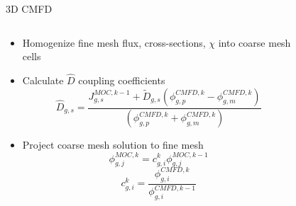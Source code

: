 \begin{frame}[t]{3D CMFD}
    
    \begin{columns}
      \begin{column}{0.6\textwidth}
        \begin{itemize}
          \item Homogenize fine mesh flux, cross-sections, $\chi$ into coarse 
          mesh cells
          \item Calculate $\hat{D}$ coupling coefficients
          \begin{equation*}\scriptstyle
          \hat{D}_{g,s} = \frac{J_{g,s}^{MOC,k-1} + 
            \tilde{D}_{g,s}\left(\phi_{g,p}^{CMFD,k} - 
            \phi_{g,m}^{CMFD,k}\right)}{\left(\phi_{g,p}^{CMFD,k} + 
            \phi_{g,m}^{CMFD,k}\right)}
          \end{equation*}
          \item Project coarse mesh solution to fine mesh
          \begin{equation*}\scriptstyle
          \phi_{g,j}^{MOC,k} = c_{g,i}^k \phi_{g,j}^{MOC,k-1}
          \end{equation*}
          \begin{equation*}\scriptstyle
          c_{g,i}^k = \frac{\phi_{g,i}^{CMFD,k}}{\phi_{g,i}^{CMFD,k-1}}
          \end{equation*}
        \end{itemize}
      \end{column}
    \begin{column}{0.4\textwidth}
      \begin{figure}[h]
        \centering
        \resizebox{!}{0.7\textheight}{}
      \end{figure}
  \end{column}
  \end{columns}
    
\end{frame}


